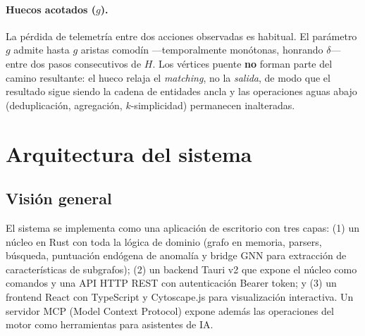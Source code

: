 \documentclass[11pt,a4paper]{article}
\begin{document}
\paragraph{Huecos acotados ($g$).} La pérdida de telemetría entre dos acciones
observadas es habitual. El parámetro $g$ admite hasta $g$ aristas comodín
---temporalmente monótonas, honrando $\delta$--- entre dos pasos consecutivos
de $H$. Los vértices puente \textbf{no} forman parte del camino resultante: el
hueco relaja el \emph{matching}, no la \emph{salida}, de modo que el resultado
sigue siendo la cadena de entidades ancla y las operaciones aguas abajo
(deduplicación, agregación, $k$-simplicidad) permanecen inalteradas.

\section{Arquitectura del sistema}

\subsection{Visión general}
El sistema se implementa como una aplicación de escritorio con tres capas:
(1) un núcleo en Rust con toda la lógica de dominio (grafo en memoria, parsers,
búsqueda, puntuación endógena de anomalía y bridge GNN para extracción de
características de subgrafos); (2) un backend Tauri v2 que expone el núcleo
como comandos y una API HTTP REST con autenticación Bearer token; y (3) un
frontend React con TypeScript y Cytoscape.js para visualización interactiva. Un
servidor MCP (Model Context Protocol) expone además las operaciones del motor
como herramientas para asistentes de IA.
\end{document}

